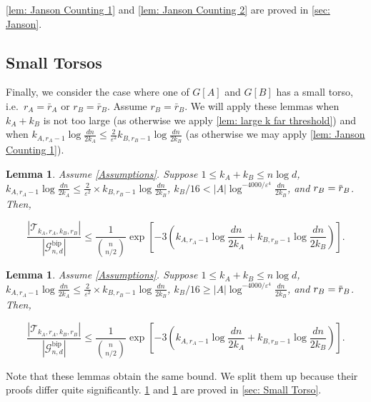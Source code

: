 \documentclass[11pt]{article}
\newcommand{\eps}{\varepsilon}
\newcommand{\overbar}[1]{\mkern 1.5mu\overline{\mkern-1.5mu#1\mkern-1.5mu}\mkern 1.5mu}
\theoremstyle{plain}
\newtheorem{lem}[thm]{Lemma}
\begin{document}
\cref{lem: Janson Counting 1} and \cref{lem: Janson Counting 2} are proved in \cref{sec: Janson}.

\subsection{Small Torsos}
Finally, we consider the case where one of $G[A]$ and $G[B]$ has a small torso, i.e.\ $r_A=\bar r_A$ or $r_B=\bar r_B$. Assume $r_B = \bar r_B$. We will apply these lemmas when $k_A + k_B$ is not too large (as otherwise we apply \cref{lem: large k far threshold}) and when $k_{A, r_A - 1}\log\frac{dn}{2k_A} \leq \frac{2}{\varepsilon^2}k_{B, r_B - 1}\log\frac{dn}{2k_B}$ (as otherwise we may apply \cref{lem: Janson Counting 1}). 
\begin{lem}\label{lem: Small torso counting small k}
    Assume \eqref{Assumptions}. Suppose $1 \leq k_A + k_B \leq n\log d$, $k_{A, r_A - 1}\log\frac{dn}{2k_A} \leq \frac{2}{\varepsilon^2}\times k_{B, r_B - 1}\log\frac{dn}{2k_B}$, $k_B/16 < |A|\log^{-4000/\eps^4}\frac{dn}{2k_B}$, and $r_B = \overbar{r}_{B}$. Then,

    \[
    \frac{|\mathcal T_{k_A, r_A, k_B, r_B}|}{|\mathcal G^{\text{bip}}_{n,d}|} \leq \frac{1}{\binom{n}{n/2}} \exp\left[ -3\left( k_{A, r_A - 1}\log\frac{dn}{2k_A} + k_{B, r_B -1}\log\frac{dn}{2k_B}\right) \right].
    \]
\end{lem}

\newtheorem*{lem: Small Torso Counting}{Lemma \ref{lem: Small Torso Counting}}
\begin{lem}\label{lem: Small Torso Counting}
    Assume \eqref{Assumptions}. Suppose $1 \leq k_A + k_B \leq n\log d$, $k_{A, r_A - 1}\log\frac{dn}{2k_A} \leq \frac{2}{\varepsilon^2}\times k_{B, r_B - 1}\log\frac{dn}{2k_B}$, $k_B/16 \geq |A|\log^{-4000/\eps^4}\frac{dn}{2k_B}$, and $r_B = \overbar{r}_{B}$. Then,

    \[
    \frac{|\mathcal T_{k_A, r_A, k_B, r_B}|}{|\mathcal G^{\text{bip}}_{n,d}|} \leq \frac{1}{\binom{n}{n/2}} \exp\left[ -3\left( k_{A, r_A - 1}\log\frac{dn}{2k_A} + k_{B, r_B -1}\log\frac{dn}{2k_B}\right) \right].
    \]
\end{lem}
Note that these lemmas obtain the same bound. We split them up because their proofs differ quite significantly.
\cref{lem: Small torso counting small k} and \cref{lem: Small Torso Counting} are proved in \cref{sec: Small Torso}.
\end{document}

